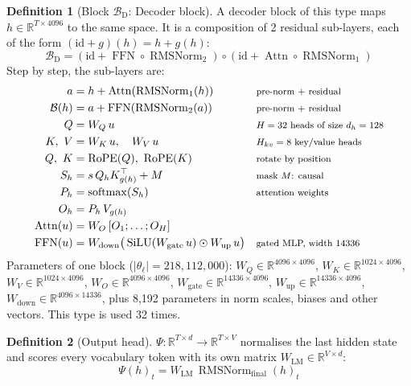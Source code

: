 \documentclass[10pt,a4paper]{article}
\newcommand{\op}[1]{\operatorname{#1}}
\theoremstyle{definition}
\newtheorem{definition}{Definition}[section]
\begin{document}
\begin{definition}[Block $\mathcal{B}_{\mathrm{D}}$: Decoder block]
A decoder block of this type maps $h\in\mathbb{R}^{T\times 4096}$ to the same space. It is a composition of 2 residual sub-layers, each of the form $(\mathrm{id}+g)(h)=h+g(h)$:
\begin{equation}
  \mathcal{B}_{\mathrm{D}} = (\mathrm{id}+\op{FFN}\circ \op{RMSNorm}_{2})\circ(\mathrm{id}+\op{Attn}\circ \op{RMSNorm}_{1})
\end{equation}
Step by step, the sub-layers are:
\begin{align*}
  a &= h + \op{Attn}(\op{RMSNorm}_{1}(h)) && \text{\footnotesize pre-norm + residual} \\
  \mathcal{B}(h) &= a + \op{FFN}(\op{RMSNorm}_{2}(a)) && \text{\footnotesize pre-norm + residual} \\
  Q &= W_Q\,u && \text{\footnotesize $H=32$ heads of size $d_h=128$} \\
  K,\ V &= W_K\,u,\quad W_V\,u && \text{\footnotesize $H_{kv}=8$ key/value heads} \\
  Q,\ K &= \op{RoPE}(Q),\ \op{RoPE}(K) && \text{\footnotesize rotate by position} \\
  S_h &= s\, Q_h K_{g(h)}^{\top} + M && \text{\footnotesize mask $M$: causal} \\
  P_h &= \op{softmax}(S_h) && \text{\footnotesize attention weights} \\
  O_h &= P_h\, V_{g(h)} \\
  \op{Attn}(u) &= W_O\,[O_1;\dots;O_H] \\
  \op{FFN}(u) &= W_{\mathrm{down}}\big(\op{SiLU}(W_{\mathrm{gate}}\,u)\odot W_{\mathrm{up}}\,u\big) && \text{\footnotesize gated MLP, width 14336}
\end{align*}
Parameters of one block ($|\theta_\ell|=218{,}112{,}000$): $W_Q\in\mathbb{R}^{4096\times4096}$, $W_K\in\mathbb{R}^{1024\times4096}$, $W_V\in\mathbb{R}^{1024\times4096}$, $W_O\in\mathbb{R}^{4096\times4096}$, $W_{\mathrm{gate}}\in\mathbb{R}^{14336\times4096}$, $W_{\mathrm{up}}\in\mathbb{R}^{14336\times4096}$, $W_{\mathrm{down}}\in\mathbb{R}^{4096\times14336}$, plus 8,192 parameters in norm scales, biases and other vectors. This type is used 32 times.
\end{definition}
\begin{definition}[Output head]
$\Psi:\mathbb{R}^{T\times d}\to\mathbb{R}^{T\times V}$ normalises the last hidden state and scores every vocabulary token with its own matrix $W_{\mathrm{LM}}\in\mathbb{R}^{V\times d}$:
\begin{equation}
  \Psi(h)_t = W_{\mathrm{LM}}\,\op{RMSNorm}_{\mathrm{final}}(h)_t
\end{equation}
\end{definition}
\end{document}
